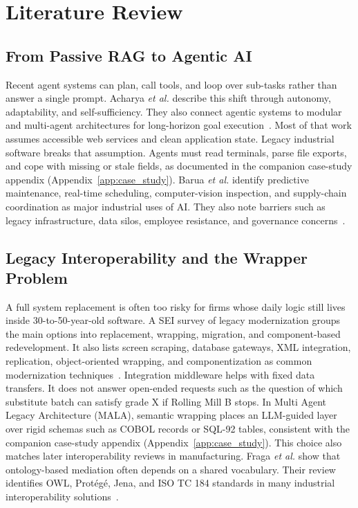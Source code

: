\documentclass[conference]{IEEEtran}
\newcommand{\MALA}{Multi Agent Legacy Architecture (MALA)}
\begin{document}
\section{Literature Review}

\subsection{From Passive RAG to Agentic AI}

Recent agent systems can plan, call tools, and loop over sub-tasks rather than answer a single prompt. Acharya \emph{et al.} describe this shift through autonomy, adaptability, and self-sufficiency. They also connect agentic systems to modular and multi-agent architectures for long-horizon goal execution~\cite{acharya2025}. Most of that work assumes accessible web services and clean application state. Legacy industrial software breaks that assumption. Agents must read terminals, parse file exports, and cope with missing or stale fields, as documented in the companion case-study appendix (Appendix~\ref{app:case_study}). Barua \emph{et al.} identify predictive maintenance, real-time scheduling, computer-vision inspection, and supply-chain coordination as major industrial uses of AI. They also note barriers such as legacy infrastructure, data silos, employee resistance, and governance concerns~\cite{barua2025}.

\subsection{Legacy Interoperability and the Wrapper Problem}

A full system replacement is often too risky for firms whose daily logic still lives inside 30-to-50-year-old software. A SEI survey of legacy modernization groups the main options into replacement, wrapping, migration, and component-based redevelopment. It also lists screen scraping, database gateways, XML integration, replication, object-oriented wrapping, and componentization as common modernization techniques~\cite{comella2000}. Integration middleware helps with fixed data transfers. It does not answer open-ended requests such as the question of which substitute batch can satisfy grade X if Rolling Mill B stops. In \MALA{}, semantic wrapping places an LLM-guided layer over rigid schemas such as COBOL records or SQL-92 tables, consistent with the companion case-study appendix (Appendix~\ref{app:case_study}). This choice also matches later interoperability reviews in manufacturing. Fraga \emph{et al.} show that ontology-based mediation often depends on a shared vocabulary. Their review identifies OWL, Prot\'eg\'e, Jena, and ISO TC 184 standards in many industrial interoperability solutions~\cite{fogliatto2020}.
\end{document}
